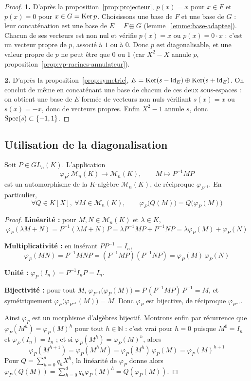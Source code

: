 \begin{proof}
\textbf{1.} D'après la proposition~\ref{prop:projecteur}, $p(x)=x$ pour $x\in F$ et $p(x)=0$ pour $x\in G=\operatorname{Ker} p$. Choisissons une base de $F$ et une base de $G$ : leur concaténation est une base de $E=F\oplus G$ (lemme~\ref{lemme:base-adaptee}). Chacun de ses vecteurs est non nul et vérifie $p(x)=x$ ou $p(x)=0\cdot x$ : c'est un vecteur propre de $p$, associé à $1$ ou à $0$. Donc $p$ est diagonalisable, et une valeur propre de $p$ ne peut être que $0$ ou $1$ (car $X^2-X$ annule $p$, proposition~\ref{prop:vp-racines-annulateur}).

\textbf{2.} D'après la proposition~\ref{prop:symetrie}, $E=\operatorname{Ker}(s-\operatorname{id}_E)\oplus\operatorname{Ker}(s+\operatorname{id}_E)$. On conclut de même en concaténant une base de chacun de ces deux sous-espaces : on obtient une base de $E$ formée de vecteurs non nuls vérifiant $s(x)=x$ ou $s(x)=-x$, donc de vecteurs propres. Enfin $X^2-1$ annule $s$, donc $\operatorname{Spec}(s)\subset\{-1,1\}$.
\end{proof}

\subsection{Utilisation de la diagonalisation}

\begin{prop}[Conjugaison]
\label{prop:conjugaison}
Soit $P\in GL_n(K)$. L'application
\[\varphi_P : \mathcal{M}_n(K)\longrightarrow\mathcal{M}_n(K), \qquad M\longmapsto P^{-1}MP\]
est un automorphisme de la $K$-algèbre $\mathcal{M}_n(K)$, de réciproque $\varphi_{P^{-1}}$. En particulier,
\[\forall Q\in K[X],\ \forall M\in\mathcal{M}_n(K),\qquad \varphi_P\big(Q(M)\big) = Q\big(\varphi_P(M)\big)\]
\end{prop}

\begin{proof}
\textbf{Linéarité :} pour $M,N\in\mathcal{M}_n(K)$ et $\lambda\in K$,
\[\varphi_P(\lambda M+N) = P^{-1}(\lambda M+N)P = \lambda P^{-1}MP + P^{-1}NP = \lambda\varphi_P(M)+\varphi_P(N)\]

\textbf{Multiplicativité :} en insérant $PP^{-1}=I_n$,
\[\varphi_P(MN) = P^{-1}MNP = (P^{-1}MP)(P^{-1}NP) = \varphi_P(M)\,\varphi_P(N)\]

\textbf{Unité :} $\varphi_P(I_n) = P^{-1}I_nP = I_n$.

\textbf{Bijectivité :} pour tout $M$, $\varphi_{P^{-1}}\big(\varphi_P(M)\big) = P\,(P^{-1}MP)\,P^{-1} = M$, et symétriquement $\varphi_P\big(\varphi_{P^{-1}}(M)\big)=M$. Donc $\varphi_P$ est bijective, de réciproque $\varphi_{P^{-1}}$.

Ainsi $\varphi_P$ est un morphisme d'algèbres bijectif. Montrons enfin par récurrence que $\varphi_P(M^h)=\varphi_P(M)^h$ pour tout $h\in\mathbb{N}$ : c'est vrai pour $h=0$ puisque $M^0=I_n$ et $\varphi_P(I_n)=I_n$ ; et si $\varphi_P(M^h)=\varphi_P(M)^h$, alors
\[\varphi_P(M^{h+1}) = \varphi_P(M^h M) = \varphi_P(M^h)\,\varphi_P(M) = \varphi_P(M)^{h+1}\]
Pour $Q=\sum_{h=0}^{d}q_hX^h$, la linéarité de $\varphi_P$ donne alors $\varphi_P(Q(M))=\sum_{h=0}^{d}q_h\varphi_P(M)^h = Q(\varphi_P(M))$.
\end{proof}

